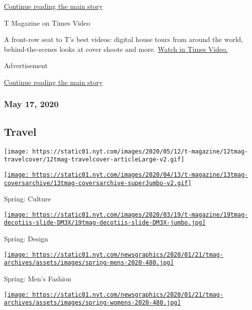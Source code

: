 \protect\hyperlink{after-mid2}{Continue reading the main story}

T Magazine on Times Video

A front-row seat to T's best videos: digital house tours from around the
world, behind-the-scenes looks at cover shoots and more.
\href{https://www.nytimes.com/video/t-magazine}{Watch in Times Video.}

Advertisement

\protect\hyperlink{after-mktg}{Continue reading the main story}

\hypertarget{may-17-2020}{%
\subsubsection{May 17, 2020}\label{may-17-2020}}

\href{https://www.nytimes.com/issue/t-magazine/2020/05/02/ts-may-17-travel-issue}{}

\hypertarget{travel}{%
\subsection{Travel}\label{travel}}

\texttt{[image: https://static01.nyt.com/images/2020/05/12/t-magazine/12tmag-travelcover/12tmag-travelcover-articleLarge-v2.gif]}

\href{https://www.nytimes.com/issue/t-magazine/2020/04/12/ts-april-19-culture-issue}{\texttt{[image: https://static01.nyt.com/images/2020/04/13/t-magazine/13tmag-coversarchive/13tmag-coversarchive-superJumbo-v2.gif]}}

Spring: Culture

\href{https://www.nytimes.com/issue/t-magazine/2020/03/06/ts-march-22-design-issue}{\texttt{[image: https://static01.nyt.com/images/2020/03/19/t-magazine/19tmag-decotiis-slide-DM3X/19tmag-decotiis-slide-DM3X-jumbo.jpg]}}

Spring: Design

\href{https://www.nytimes.com/issue/t-magazine/2020/02/21/ts-march-8-mens-fashion-issue}{\texttt{[image: https://static01.nyt.com/newsgraphics/2020/01/21/tmag-archives/assets/images/spring-mens-2020-480.jpg]}}

Spring: Men's Fashion

\href{https://www.nytimes.com/issue/t-magazine/2020/02/06/ts-feb-23-womens-fashion-issue}{\texttt{[image: https://static01.nyt.com/newsgraphics/2020/01/21/tmag-archives/assets/images/spring-womens-2020-480.jpg]}}

